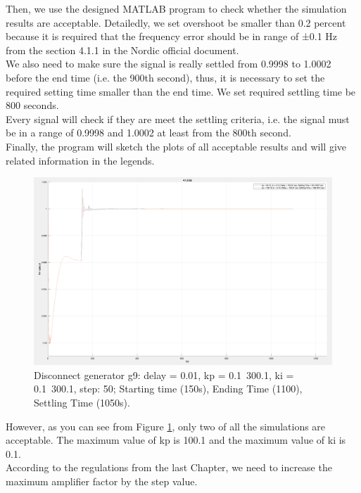 \documentclass{report}
\begin{document}
Then, we use the designed MATLAB program to check whether the simulation results are acceptable. Detailedly, we set overshoot be smaller than 0.2 percent because it is required that the frequency error should be in range of ±0.1 Hz from the section 4.1.1 in the Nordic official document.\\

We also need to make sure the signal is really settled from 0.9998 to 1.0002 before the end time (i.e. the 900th second), thus, it is necessary to set the required setting time smaller than the end time. We set required settling time be 800 seconds. \\

Every signal will check if they are meet the settling criteria, i.e. the signal must be in a range of 0.9998 and 1.0002 at least from the 800th second.\\

Finally, the program will sketch the plots of all acceptable results and will give related information in the legends. \\

\begin{figure}[htbp]
\centering
\includegraphics[width = .819\textwidth]{figure/4_1_2_a.png}
\caption{Disconnect generator g9: delay = 0.01, kp = 0.1~300.1, ki = 0.1~300.1, step: 50; Starting time (150s), Ending Time (1100), Settling Time (1050s).}
\label{4_1_2_a}
\end{figure}

However, as you can see from Figure \textcolor{red}{\ref{4_1_2_a}}, only two of all the simulations are acceptable. The maximum value of kp is 100.1 and the maximum value of ki is 0.1. \\

According to the regulations from the last Chapter, we need to increase the maximum amplifier factor by the step value. \\
\end{document}
